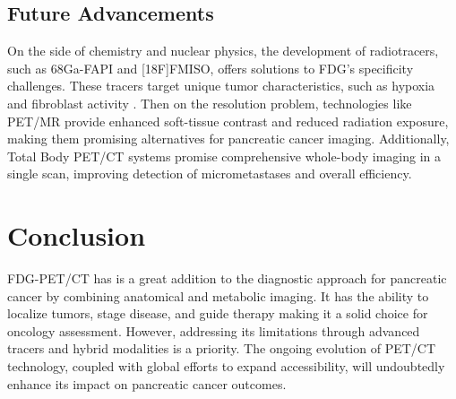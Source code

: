 \documentclass[11pt]{article} %
\begin{document}
\subsection{Future Advancements}

On the side of chemistry and nuclear physics, the development of radiotracers, such as 68Ga-FAPI and [18F]FMISO, offers solutions to FDG’s specificity challenges. These tracers target unique tumor characteristics, such as hypoxia and fibroblast activity \cite{Deng2021}. Then on the resolution problem, technologies like PET/MR provide enhanced soft-tissue contrast and reduced radiation exposure, making them promising alternatives for pancreatic cancer imaging. Additionally, Total Body PET/CT systems promise comprehensive whole-body imaging in a single scan, improving detection of micrometastases and overall efficiency.


\section{Conclusion}

FDG-PET/CT has is a great addition to the diagnostic approach for pancreatic cancer by combining anatomical and metabolic imaging. It has the ability to localize tumors, stage disease, and guide therapy making it a solid choice for oncology assessment. However, addressing its limitations through advanced tracers and hybrid modalities is a priority. The ongoing evolution of PET/CT technology, coupled with global efforts to expand accessibility, will undoubtedly enhance its impact on pancreatic cancer outcomes.


\end{document}
